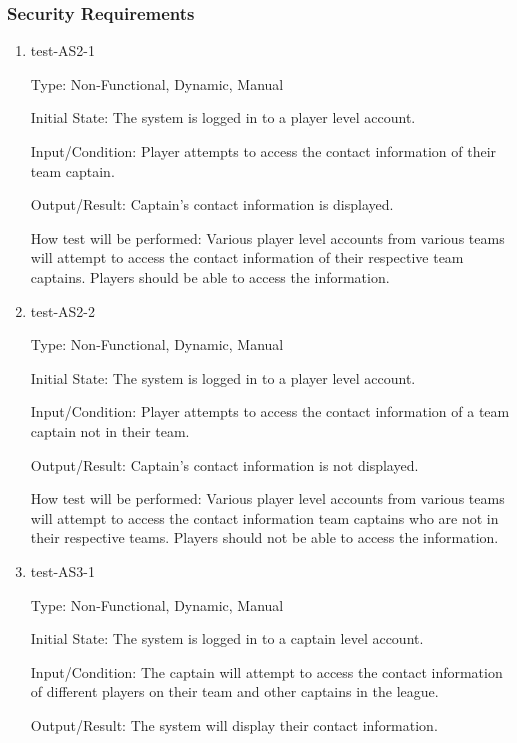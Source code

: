 \documentclass[12pt, titlepage]{article}
\begin{document}
\subsubsection{Security Requirements}

\begin{enumerate}

  \item{test-AS2-1\\}

  Type: Non-Functional, Dynamic, Manual

  Initial State: The system is logged in to a player level account.

  Input/Condition: Player attempts to access the contact information of their 
  team captain.

  Output/Result: Captain's contact information is displayed.

  How test will be performed: Various player level accounts from various teams 
  will attempt to access the contact information of their respective team
  captains. Players should be able to access the information.

  \item{test-AS2-2\\}

  Type: Non-Functional, Dynamic, Manual

  Initial State: The system is logged in to a player level account.

  Input/Condition: Player attempts to access the contact information of a 
  team captain not in their team.

  Output/Result: Captain's contact information is not displayed.

  How test will be performed: Various player level accounts from various teams 
  will attempt to access the contact information team captains who are not 
  in their respective teams. Players should not be able to access the information.

  \item{test-AS3-1\\}

  Type: Non-Functional, Dynamic, Manual

  Initial State: The system is logged in to a captain level account.

  Input/Condition: The captain will attempt to access the contact information
  of different players on their team and other captains in the league.

  Output/Result: The system will display their contact information.


\end{enumerate}
\end{document}
